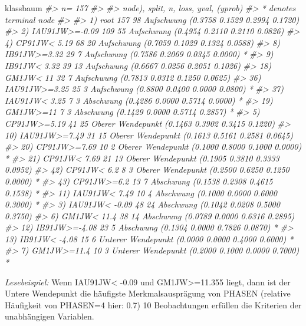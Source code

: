 \documentclass[12pt,]{book}
\makeatletter
\newenvironment{Shaded}{\begin{snugshade}}{\end{snugshade}}
\newcommand{\CommentTok}[1]{\textcolor[rgb]{0.56,0.35,0.01}{\textit{{#1}}}}
\newcommand{\NormalTok}[1]{{#1}}
\newenvironment{kframe}{%
\medskip{}
\setlength{\fboxsep}{.8em}
 \def\at@end@of@kframe{}%
 \ifinner\ifhmode%
  \def\at@end@of@kframe{\end{minipage}}%
  \begin{minipage}{\columnwidth}%
 \fi\fi%
 \def\FrameCommand##1{\hskip\@totalleftmargin \hskip-\fboxsep
 \colorbox{shadecolor}{##1}\hskip-\fboxsep
     \hskip-\linewidth \hskip-\@totalleftmargin \hskip\columnwidth}%
 \MakeFramed {\advance\hsize-\width
   \@totalleftmargin\z@ \linewidth\hsize
   \@setminipage}}%
 {\par\unskip\endMakeFramed%
 \at@end@of@kframe}
\renewenvironment{Shaded}{\begin{kframe}}{\end{kframe}}
\makeatother
\begin{document}
\begin{Shaded}
\begin{Highlighting}[]
\NormalTok{klassbaum}
\CommentTok{#> n= 157 }
\CommentTok{#> }
\CommentTok{#> node), split, n, loss, yval, (yprob)}
\CommentTok{#>       * denotes terminal node}
\CommentTok{#> }
\CommentTok{#>  1) root 157 98 Aufschwung (0.3758 0.1529 0.2994 0.1720)  }
\CommentTok{#>    2) IAU91JW>=-0.09 109 55 Aufschwung (0.4954 0.2110 0.2110 0.0826)  }
\CommentTok{#>      4) CP91JW< 5.19 68 20 Aufschwung (0.7059 0.1029 0.1324 0.0588)  }
\CommentTok{#>        8) IB91JW>=3.32 29  7 Aufschwung (0.7586 0.2069 0.0345 0.0000) *}
\CommentTok{#>        9) IB91JW< 3.32 39 13 Aufschwung (0.6667 0.0256 0.2051 0.1026)  }
\CommentTok{#>         18) GM1JW< 11 32  7 Aufschwung (0.7813 0.0312 0.1250 0.0625)  }
\CommentTok{#>           36) IAU91JW>=3.25 25  3 Aufschwung (0.8800 0.0400 0.0000 0.0800) *}
\CommentTok{#>           37) IAU91JW< 3.25 7  3 Abschwung (0.4286 0.0000 0.5714 0.0000) *}
\CommentTok{#>         19) GM1JW>=11 7  3 Abschwung (0.1429 0.0000 0.5714 0.2857) *}
\CommentTok{#>      5) CP91JW>=5.19 41 25 Oberer Wendepunkt (0.1463 0.3902 0.3415 0.1220)  }
\CommentTok{#>       10) IAU91JW>=7.49 31 15 Oberer Wendepunkt (0.1613 0.5161 0.2581 0.0645)  }
\CommentTok{#>         20) CP91JW>=7.69 10  2 Oberer Wendepunkt (0.1000 0.8000 0.1000 0.0000) *}
\CommentTok{#>         21) CP91JW< 7.69 21 13 Oberer Wendepunkt (0.1905 0.3810 0.3333 0.0952)  }
\CommentTok{#>           42) CP91JW< 6.2 8  3 Oberer Wendepunkt (0.2500 0.6250 0.1250 0.0000) *}
\CommentTok{#>           43) CP91JW>=6.2 13  7 Abschwung (0.1538 0.2308 0.4615 0.1538) *}
\CommentTok{#>       11) IAU91JW< 7.49 10  4 Abschwung (0.1000 0.0000 0.6000 0.3000) *}
\CommentTok{#>    3) IAU91JW< -0.09 48 24 Abschwung (0.1042 0.0208 0.5000 0.3750)  }
\CommentTok{#>      6) GM1JW< 11.4 38 14 Abschwung (0.0789 0.0000 0.6316 0.2895)  }
\CommentTok{#>       12) IB91JW>=-4.08 23  5 Abschwung (0.1304 0.0000 0.7826 0.0870) *}
\CommentTok{#>       13) IB91JW< -4.08 15  6 Unterer Wendepunkt (0.0000 0.0000 0.4000 0.6000) *}
\CommentTok{#>      7) GM1JW>=11.4 10  3 Unterer Wendepunkt (0.2000 0.1000 0.0000 0.7000) *}
\end{Highlighting}
\end{Shaded}

\emph{Lesebeispiel:} Wenn IAU91JW\textless{} -0.09 und
GM1JW\textgreater{}=11.355 liegt, dann ist der Untere Wendepunkt die
häufigste Merkmalsausprägung von PHASEN (relative Häufigkeit von
PHASEN=4 hier: 0.7) 10 Beobachtungen erfüllen die Kriterien der
unabhängigen Variablen.
\end{document}
